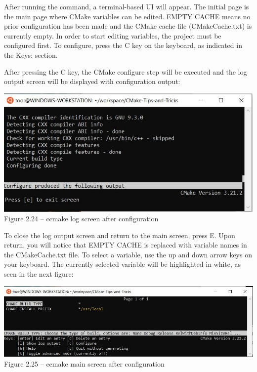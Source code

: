 After running the command, a terminal-based UI will appear. The initial page is the main page where CMake variables can be edited. EMPTY CACHE means no prior configuration has been made and the CMake cache file (CMakeCache.txt) is currently empty. In order to start editing variables, the project must be configured first. To configure, press the C key on the keyboard, as indicated in the Keys: section.

After pressing the C key, the CMake configure step will be executed and the log output screen will be displayed with configuration output:

\begin{center}
\includegraphics[width=1.\textwidth]{content/1/chapter2/images/24.jpg}\\
Figure 2.24 – ccmake log screen after configuration
\end{center}

To close the log output screen and return to the main screen, press E. Upon return, you will notice that EMPTY CACHE is replaced with variable names in the CMakeCache.txt file. To select a variable, use the up and down arrow keys on your keyboard. The currently selected variable will be highlighted in white, as seen in the next figure:

\begin{center}
\includegraphics[width=1.\textwidth]{content/1/chapter2/images/25.jpg}\\
Figure 2.25 – ccmake main screen after configuration
\end{center}

